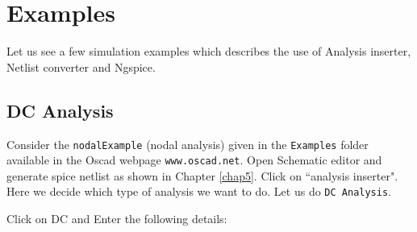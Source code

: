 \section{Examples}
Let us see a few simulation examples  which describes the use of Analysis inserter, Netlist converter and Ngspice.
\subsection{DC Analysis} 
\label{dc}
Consider the {\tt nodalExample} (nodal analysis) given in the {\tt Examples} folder available in the Oscad webpage   {\tt www.oscad.net}. Open Schematic editor and generate spice netlist as shown in Chapter \ref{chap5}. Click on ``analysis inserter". Here we decide which type of analysis we want to do. Let us do {\tt DC Analysis}.

  Click on DC  and Enter the following details:

